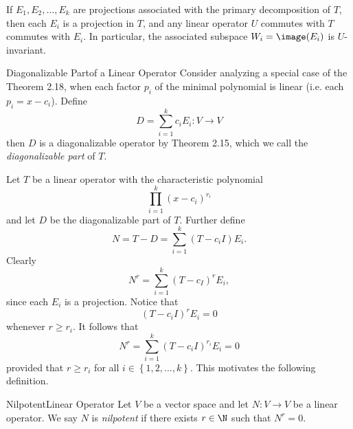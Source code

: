 \documentclass[linearalgebraII]{subfiles}
\begin{document}
    \begin{cor}{}
        If $E_1, E_2, \ldots, E_k$ are projections associated with the primary decomposition of $T$, then each $E_i$ is a projection in $T$, and any linear operator $U$ commutes with $T$ commutes with $E_i$. In particular, the associated subspace $W_i = \image(E_i)$ is $U$-invariant.
    \end{cor}	

    \begin{definition}{Diagonalizable Part}{of a Linear Operator}
        Consider analyzing a special case of the Theorem 2.18, when each factor $p_i$ of the minimal polynomial is linear (i.e. each $p_i = x-c_i$). Define
        \begin{equation*}
            D = \sum^{k}_{i=1} c_iE_i:V\to V
        \end{equation*}
        then $D$ is a diagonalizable operator by Theorem 2.15, which we call the \emph{diagonalizable part} of $T$.
    \end{definition}

    \begin{remark}
        Let $T$ be a linear operator with the characteristic polynomial
        \begin{equation*}
            \prod^{k}_{i=1} (x-c_i)^{r_i}
        \end{equation*}
        and let $D$ be the diagonalizable part of $T$. Further define
        \begin{equation*}
            N = T - D = \sum^{k}_{i=1} (T-c_iI)E_i.
        \end{equation*}
        Clearly
        \begin{equation*}
            N^r = \sum^{k}_{i=1} (T-c_I)^rE_i,
        \end{equation*}
        since each $E_i$ is a projection. Notice that
        \begin{equation*}
            (T-c_iI)^rE_i = 0
        \end{equation*}
        whenever $r\geq r_i$. It follows that
        \begin{equation*}
            N^r = \sum^{k}_{i=1} \left( T-c_iI \right) ^{r_i} E_i = 0 
        \end{equation*}
        provided that $r\geq r_i$ for all $i\in \left\lbrace 1, 2, \ldots, k \right\rbrace$. This motivates the following definition.
    \end{remark}

    \begin{definition}{Nilpotent}{Linear Operator}
        Let $V$ be a vector space and let $N:V\to V$ be a linear operator. We say $N$ is \emph{nilpotent} if there exists $r\in \N$ such that $N^r = 0$. 
    \end{definition}
\end{document}
